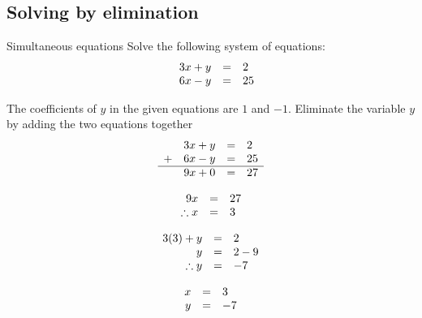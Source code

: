 \subsection*{Solving by elimination}

\begin{wex}
{Simultaneous equations }
{
Solve the following system of equations:
\begin{equation*}
\begin{array}{ccll}\hfill & 3x+y& =& 2\hfill \\ 

\hfill& 6x-y& =& 25\hfill 
\end{array}
\end{equation*}
}
{
The coefficients of $y$ in the given equations are $1$ and $-1$. Eliminate the variable $y$ by adding the two equations together
\begin{equation*}
\begin{array}{ccll}\hfill & 3x+y& =& 2\hfill \\ 
\hfill+ & 6x-y& =& 25\hfill \\ \hline
 \hfill & 9x + 0 &=& 27
\end{array}
\end{equation*}


\begin{equation*}
    \begin{array}{ccl}\hfill 9x& =& 27\hfill \\
	\hfill \therefore x  & =& 3\hfill 
    \end{array}
\end{equation*}

\begin{equation*}
    \begin{array}{ccl}\hfill 3(3) + y &=& 2\\
	\hfill y & =& 2-9\\
	\hfill \therefore y & =& -7 
   \end{array}
\end{equation*}


\begin{equation*}
\begin{array}{ccc}
 \hfill x& =& 3\hfill \\
\hfill y& =& -7\hfill 
\end{array}
\end{equation*}
}
\end{wex}

